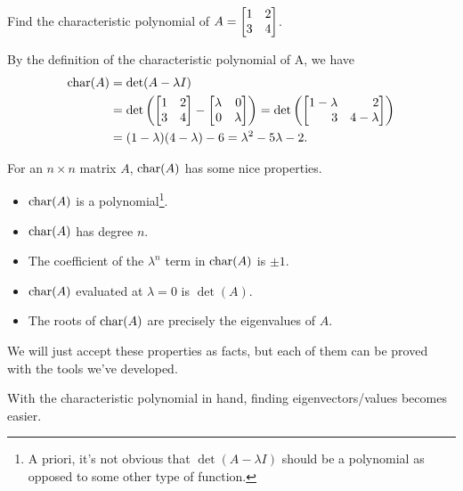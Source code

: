 \begin{example}
	Find the characteristic polynomial of $A=\mat{1&2\\3&4}$.
	
	By the definition of the characteristic polynomial of A, we have
	\begin{align*}
	    \Char(A) &=\det(A-\lambda I)\\
	            &=\det\left(\mat{1&2\\3&4}-\mat{\lambda&0\\0&\lambda}\right)=\det\left(\mat{1-\lambda&2\\3&4-\lambda}\right)\\
	            &=(1-\lambda)(4-\lambda) - 6=\lambda^2 -5\lambda-2.
	\end{align*}
\end{example}
For an $n\times n$ matrix $A$, $\operatorname{char}(A)$ has some nice properties.
\begin{itemize}
	\item $\operatorname{char}(A)$ is a polynomial\footnote{ A priori, it's not obvious that $\det(A-\lambda I)$
	should be a polynomial as opposed to some other type of function.}.
	\item $\operatorname{char}(A)$ has degree $n$.
	\item The coefficient of the $\lambda^n$ term in $\operatorname{char}(A)$ is $\pm1$.
	\item $\operatorname{char}(A)$ evaluated at $\lambda = 0$ is $\det(A)$.
	\item The roots of $\operatorname{char}(A)$ are precisely the eigenvalues of $A$.
\end{itemize}
We will just accept these properties as facts, but each of them can be proved with the tools we've developed.


With the characteristic polynomial in hand, finding eigenvectors/values becomes easier.

